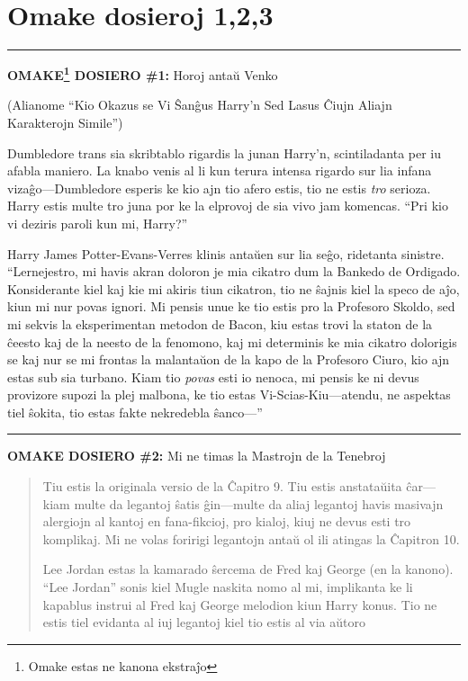 \chapter{Omake dosieroj 1,2,3}

\begin{center}\rule{3in}{0.4pt}\end{center}

\textbf{OMAKE\footnote{Omake estas ne kanona ekstraĵo} DOSIERO \#1:} {
    Horoj antaŭ Venko}

(Alianome ``Kio Okazus se Vi Ŝanĝus Harry'n Sed Lasus Ĉiujn Aliajn Karakterojn Simile'')

Dumbledore trans sia skribtablo rigardis la junan Harry'n,
scintiladanta per iu afabla maniero. La knabo venis al li kun terura
intensa rigardo sur lia infana vizaĝo—Dumbledore esperis ke kio ajn
tio afero estis, tio ne estis \emph{tro} serioza. Harry estis multe
tro juna por ke la elprovoj de sia vivo jam komencas. ``Pri kio vi
deziris paroli kun mi, Harry?''

Harry James Potter-Evans-Verres klinis antaŭen sur lia seĝo, ridetanta
sinistre. ``Lernejestro, mi havis akran doloron je mia cikatro dum la
Bankedo de Ordigado. Konsiderante kiel kaj kie mi akiris tiun
cikatron, tio ne ŝajnis kiel la speco de aĵo, kiun mi nur povas
ignori. Mi pensis unue ke tio estis pro la Profesoro Skoldo, sed mi
sekvis la eksperimentan metodon de Bacon, kiu estas trovi la staton de
la ĉeesto kaj de la neesto de la fenomono, kaj mi determinis ke mia
cikatro dolorigis se kaj nur se mi frontas la malantaŭon de la kapo de
la Profesoro Ciuro, kio ajn estas sub sia turbano. Kiam tio
\emph{povas} esti io nenoca, mi pensis ke ni devus provizore supozi la
plej malbona, ke tio estas Vi-Scias-Kiu—atendu, ne aspektas tiel
ŝokita, tio estas fakte nekredebla ŝanco—''

\begin{center}\rule{3in}{0.4pt}\end{center}

\textbf{OMAKE DOSIERO \#2:} {\hpfont Mi ne timas la Mastrojn de la Tenebroj}

\begin{quote}
  Tiu estis la originala versio de la Ĉapitro 9. Tiu estis anstataŭita
  ĉar—kiam multe da legantoj ŝatis ĝin—multe da aliaj legantoj havis
  masivajn alergiojn al kantoj en fana-fikcioj, pro kialoj, kiuj ne
  devus esti tro komplikaj. Mi ne volas foririgi legantojn antaŭ ol
  ili atingas la Ĉapitron 10.

  Lee Jordan estas la kamarado ŝercema de Fred kaj George (en la
  kanono). ``Lee Jordan'' sonis kiel Mugle naskita nomo al mi,
  implikanta ke li kapablus instrui al Fred kaj George melodion kiun
  Harry konus. Tio ne estis tiel evidanta al iuj legantoj kiel tio
  estis al via aŭtoro
\end{quote}

